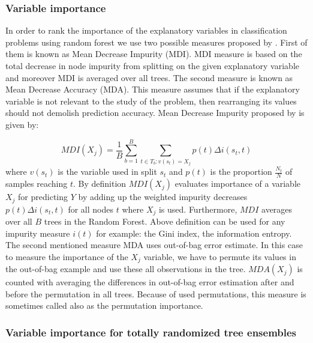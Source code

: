 \subsubsection{Variable importance}
In order to rank the importance of the explanatory variables in classification problems using random forest 
we use two possible measures proposed by \cite{breiman2001random}. 
First of them is known as Mean Decrease Impurity (MDI). MDI measure is based on the total decrease in node impurity from splitting 
on the given explanatory variable and moreover MDI is averaged over all trees. 
The second measure is known as Mean Decrease Accuracy (MDA). 
This measure assumes that if the explanatory variable is not relevant to the study of the problem, 
then rearranging its values should not demolish prediction accuracy. Mean Decrease Impurity proposed 
by \cite{breiman2001random} is given by: 

\begin{equation}\label{eq:MDI}
	{MDI}( X_{j} ) = \frac{1}{B} \displaystyle \sum_{b=1}^{B}  \displaystyle\sum_{t \in T_{b}: v(s_{t})=  X_{j}  } p(t)\Delta i(s_{t}, t)
\end{equation}
where $ v(s_{t}) $ is the variable used in split $s_{t}$ and $ p(t) $ is the proportion $\frac{N_{t}}{N}$ of samples reaching $t$.
By definition $ MDI( X_{j} ) $ evaluates importance of a variable $ X_{j} $ for predicting $Y$ by 
adding up the weighted impurity decreases $p(t) \Delta i(s_{t}, t)$ for all nodes $t$ where $ X_{j}$ is used. 
Furthermore, $MDI$ averages over all $B$ trees in the Random Forest. 
Above definition can be used for any impurity measure $i(t)$ for example: the Gini index, the information entropy. 
The second mentioned measure MDA uses out-of-bag error estimate. 
In this case to measure the importance of the $X_{j}$ variable, we have to permute its values in the out-of-bag example and 
use these all observations in the tree. $ MDA( X_{j} )$ is counted with averaging the differences in 
out-of-bag error estimation after and before the permutation in all trees. Because of used permutations, 
this measure is sometimes called also as the permutation importance.

\subsubsection{Variable importance for totally randomized tree ensembles}

